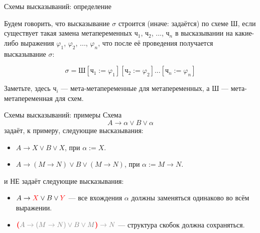 \documentclass[handout]{beamer}
\begin{document}
\begin{frame}{Схемы высказываний: определение}

\begin{defrus}Будем говорить, что высказывание $\sigma$ строится (иначе: задаётся) по схеме $\textit{Ш}$, 
если существует такая замена метапеременных $\textit{ч}_1$, $\textit{ч}_2$, ..., $\textit{ч}_n$ 
в высказывании на какие-либо выражения $\varphi_1$, $\varphi_2$, ..., $\varphi_n$, 
что после её проведения получается высказывание $\sigma$:

$$\sigma = \textit{Ш}[\textit{ч}_1 := \varphi_1][\textit{ч}_2 := \varphi_2]...[\textit{ч}_n := \varphi_n]$$

Заметьте, здесь $\textit{ч}_i$ --- мета-метапеременные для метапеременных, а $\textit{Ш}$ --- мета-метапеременная для схем.
\end{defrus}
\end{frame}

\begin{frame}{Схемы высказываний: примеры}
Схема $$A \rightarrow \alpha \vee B \vee \alpha$$ задаёт, к примеру, следующие высказывания:
\begin{itemize}
\item $A \rightarrow X \vee B \vee X$, при $\alpha := X$.
\item $A \rightarrow (M\rightarrow N) \vee B \vee (M \rightarrow N)$, при $\alpha := M\rightarrow N$.
\end{itemize}

\vspace{0.5cm}\pause

и {\color{red} НЕ} задаёт следующие высказывания:
\begin{itemize}
\item {\color{red} $A \rightarrow {\color{red}X} \vee B \vee {\color{red}Y}$} --- все вхождения $\alpha$ должны заменяться одинаково во всём выражении.
\item { ${\color{red}\textbf{(}}{\color{gray}A \rightarrow (M \rightarrow N) \vee B \vee M}{\color{red}\textbf{)}} \color{gray}\rightarrow N$} --- структура скобок должна сохраняться.
\end{itemize}

\end{frame}

%
%
%
%
%
%
\end{document}
